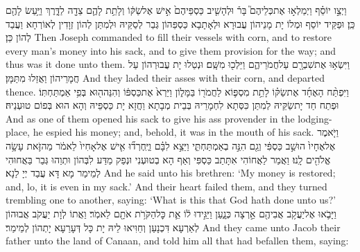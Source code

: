 {וַיְצַ֣ו יוֹסֵ֗ף וַיְמַלְא֣וּ אֶת\maqqaf כְּלֵיהֶם֮ בָּר֒ וּלְהָשִׁ֤יב כַּסְפֵּיהֶם֙ אִ֣ישׁ אֶל\maqqaf שַׂקּ֔וֹ וְלָתֵ֥ת לָהֶ֛ם צֵדָ֖ה לַדָּ֑רֶךְ וַיַּ֥עַשׂ לָהֶ֖ם כֵּֽן׃}
{וּפַקֵּיד יוֹסֵף וּמְלוֹ יָת מָנֵיהוֹן עֲבוּרָא וּלְאָתָבָא כַּסְפֵּהוֹן גְּבַר לְסַקֵּיהּ וּלְמִתַּן לְהוֹן זְוָדִין לְאוֹרְחָא וַעֲבַד לְהוֹן כֵּן׃}
{Then Joseph commanded to fill their vessels with corn, and to restore every man’s money into his sack, and to give them provision for the way; and thus was it done unto them.}{}
{וַיִּשְׂא֥וּ אֶת\maqqaf שִׁבְרָ֖ם עַל\maqqaf חֲמֹרֵיהֶ֑ם וַיֵּלְכ֖וּ מִשָּֽׁם׃}
{וּנְטַלוּ יָת עֲבוּרְהוֹן עַל חֲמָרֵיהוֹן וַאֲזַלוּ מִתַּמָּן׃}
{And they laded their asses with their corn, and departed thence.}{}
{וַיִּפְתַּ֨ח הָאֶחָ֜ד אֶת\maqqaf שַׂקּ֗וֹ לָתֵ֥ת מִסְפּ֛וֹא לַחֲמֹר֖וֹ בַּמָּל֑וֹן וַיַּרְא֙ אֶת\maqqaf כַּסְפּ֔וֹ וְהִנֵּה\maqqaf ה֖וּא בְּפִ֥י אַמְתַּחְתּֽוֹ׃}
{וּפְתַח חַד יָתשַׂקֵּיהּ לְמִתַּן כִּסְּתָא לִחְמָרֵיהּ בְּבֵית מְבָתָא וַחֲזָא יָת כַּסְפֵּיהּ וְהָא הוּא בְּפוֹם טוּעְנֵיהּ׃}
{And as one of them opened his sack to give his ass provender in the lodging-place, he espied his money; and, behold, it was in the mouth of his sack.}{}
{וַיֹּ֤אמֶר אֶל\maqqaf אֶחָיו֙ הוּשַׁ֣ב כַּסְפִּ֔י וְגַ֖ם הִנֵּ֣ה בְאַמְתַּחְתִּ֑י וַיֵּצֵ֣א לִבָּ֗ם וַיֶּֽחֶרְד֞וּ אִ֤ישׁ אֶל\maqqaf אָחִיו֙ לֵאמֹ֔ר מַה\maqqaf זֹּ֛את עָשָׂ֥ה אֱלֹהִ֖ים לָֽנוּ׃}
{וַאֲמַר לַאֲחוֹהִי אִתָּתַב כַּסְפִּי וְאַף הָא בְטוּעְנִי וּנְפַק מַדַּע לִבְּהוֹן וּתְוַהוּ גְּבַר בַּאֲחוּהִי לְמֵימַר מָא דָּא עֲבַד יְיָ לַנָא׃}
{And he said unto his brethren: ‘My money is restored; and, lo, it is even in my sack.’ And their heart failed them, and they turned trembling one to another, saying: ‘What is this that God hath done unto us?’}{}
{וַיָּבֹ֛אוּ אֶל\maqqaf יַעֲקֹ֥ב אֲבִיהֶ֖ם אַ֣רְצָה כְּנָ֑עַן וַיַּגִּ֣ידוּ ל֔וֹ אֵ֛ת כׇּל\maqqaf הַקֹּרֹ֥ת אֹתָ֖ם לֵאמֹֽר׃}
{וַאֲתוֹ לְוָת יַעֲקֹב אֲבוּהוֹן לְאַרְעָא דִּכְנָעַן וְחַוִּיאוּ לֵיהּ יָת כָּל דְּעָרַעָא יָתְהוֹן לְמֵימַר׃}
{And they came unto Jacob their father unto the land of Canaan, and told him all that had befallen them, saying:}{}
